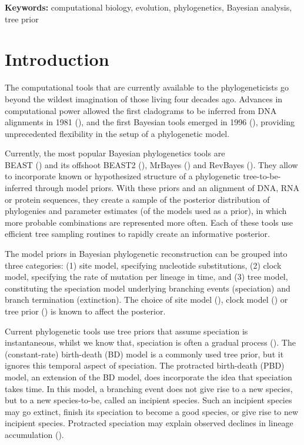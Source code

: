 \documentclass{article}
\begin{document}
{\bf Keywords:} computational biology, evolution, phylogenetics, Bayesian analysis, tree prior

\section{Introduction}

The computational tools that are currently available 
to the phylogeneticists go beyond the wildest 
imagination of those living four decades ago.
Advances in computational power allowed the first cladograms to be inferred 
from DNA alignments in 1981 (\cite{felsenstein1981}), and  
the first Bayesian tools emerged in 1996 (\cite{rannala1996}),
providing unprecedented flexibility in the setup of a phylogenetic model.

Currently, the most popular Bayesian phylogenetics tools are \\ 
BEAST (\cite{beast}) and its offshoot BEAST2 (\cite{beast2}), 
MrBayes (\cite{mrbayes}) and RevBayes (\cite{revbayes}). 
They allow to incorporate known or hypothesized structure of a phylogenetic 
tree-to-be-inferred through model priors. 
With these priors and an alignment of DNA, RNA or protein sequences, 
they create a sample of the posterior distribution
of phylogenies and parameter estimates (of the models used as a prior), 
in which more probable combinations are represented more often.
Each of these tools use efficient tree sampling routines to rapidly create an 
informative posterior.

The model priors in Bayesian phylogenetic reconstruction 
can be grouped into three categories: (1) site model, specifying 
nucleotide substitutions, (2) clock model, specifying
the rate of mutation per lineage in time, and (3) tree model, 
constituting the speciation model underlying branching events (speciation) 
and branch termination (extinction).
The choice of site model (\cite{posada_and_buckley_2004}), 
clock model (\cite{baele_et_al_2012}) 
or tree prior (\cite{moller2018, yang_and_ranalla_2005}) is known to affect
the posterior.

Current phylogenetic tools use tree priors 
that assume speciation is instantaneous, whilst we know that, 
speciation is often a gradual process (\cite{schluter2009}).
The (constant-rate) birth-death (BD) model is a commonly 
used tree prior, but it ignores this temporal aspect of speciation.
The protracted birth-death (PBD) model, an extension of 
the BD model, does incorporate the idea that speciation takes time.
In this model, a branching event does not give rise to a new species, but to
a new species-to-be, called an incipient species. Such an incipient
species may go extinct, finish its speciation to become a good species, or give
rise to new incipient species. Protracted speciation may explain observed 
declines in lineage accumulation (\cite{etienne_and_rosindell_2012}).
\end{document}
